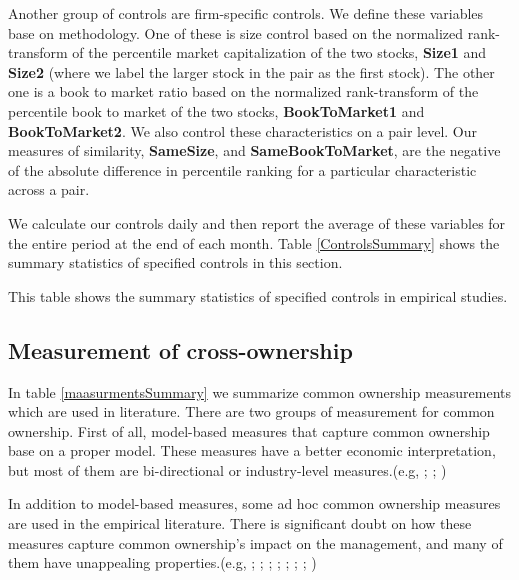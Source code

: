 \documentclass[12pt, a4paper]{article}
\begin{document}
Another group of controls are firm-specific controls.  We define these variables base on  \cite{AntonPolk} methodology. One of these is size control based on the normalized rank-transform of the percentile market capitalization of the two stocks, \textbf{Size1} and \textbf{Size2} (where we label the
larger stock in the pair as the first stock). The other one is a book to market ratio based on the normalized rank-transform of the percentile book to market of the two stocks, \textbf{BookToMarket1} and \textbf{BookToMarket2}.
We also control these characteristics on a pair level. Our measures of similarity, \textbf{SameSize}, and \textbf{SameBookToMarket}, are the negative of the absolute difference in percentile ranking for a particular characteristic across a pair.


We calculate our controls daily and then report the average of these variables for the entire period at the end of each month. Table \ref{ControlsSummary} shows the summary statistics of specified controls in this section.




 \begin{table}[htbp]
 \caption{\scriptsize This table shows the summary statistics of specified controls in empirical studies.}
 \label{ControlsSummary}
               \centering 
               \scriptsize
                \resizebox{\textwidth}{!}  {
    
                 }
             \end{table}
         
         
 


\FloatBarrier

\subsection{Measurement of cross-ownership}


In table \ref{maasurmentsSummary} we summarize common ownership measurements which are used in literature. There are two groups of measurement for common ownership.
First of all, model-based measures that capture common ownership base on a proper  model. These measures have a better economic interpretation, but most of them are bi-directional or industry-level measures.(e.g, \cite{harford2011institutional}; \cite{azar2018anticompetitive}; \cite{gilje2020s})

In addition to model-based measures, some ad hoc common ownership measures are used in the empirical literature. There is significant doubt on how these measures capture common ownership's impact on the management, and many of them have unappealing properties.(e.g, \cite{AntonPolk}; \cite{azar2011new}; \cite{freeman2019effects}; \cite{hansen1996externalities};  \cite{he2017product}; \cite{he2019internalizing}; \cite{lewellen2021does}; \cite{newham2018common})
\end{document}
